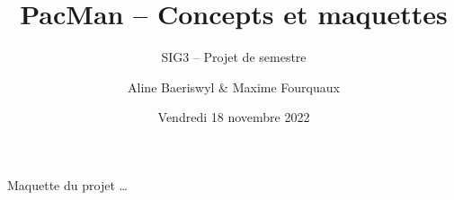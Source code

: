 \documentclass{beamer}
\title{PacMan -- Concepts et maquettes}
\subtitle{SIG3 -- Projet de semestre}
\author{Aline Baeriswyl \& Maxime Fourquaux}
\date{Vendredi 18 novembre 2022}
\institute[HEIG]%
{
    HEIG-VD  -- EC+G \\
    Orientation GGT
}
\begin{document}
\frame{\titlepage}


\begin{frame}{Maquette du projet}
    \dots
\end{frame}
\end{document}
